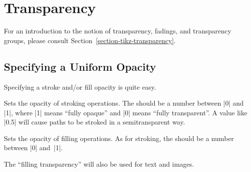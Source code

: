 %
%
%


\section[base-transparency]{Transparency}
\label{section-transparency}

For an introduction to the notion of transparency, fadings, and transparency
groups, please consult Section~\ref{section-tikz-transparency}.


\subsection{Specifying a Uniform Opacity}

Specifying a stroke and/or fill opacity is quite easy.

\begin{command}{\pgfsetstrokeopacity{}}
    Sets the opacity of stroking operations. The  should be a
    number between |0| and |1|, where |1| means ``fully opaque'' and |0| means
    ``fully transparent''. A value like |0.5| will cause paths to be stroked in
    a semitransparent way.
\begin{codeexample}[]
\begin{pgfpicture}
  \pgfsetlinewidth{5mm}
  \color{red}
  \pgfpathcircle{\pgfpoint{0cm}{0cm}}{10mm} 
  \color{black}
  \pgfpathcircle{\pgfpoint{1cm}{0cm}}{10mm} 
\end{pgfpicture}
\end{codeexample}
\end{command}

\begin{command}{\pgfsetfillopacity{}}
    Sets the opacity of filling operations. As for stroking, the 
    should be a number between |0| and~|1|.

    The ``filling transparency'' will also be used for text and images.
\begin{codeexample}[]
\end{codeexample}
\end{command}

